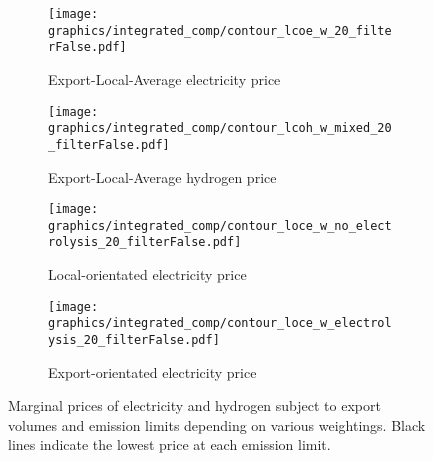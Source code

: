 \begin{figure*}[h] %
    \centering
    \begin{subfigure}[b]{0.45\linewidth}
        \centering
        \texttt{[image: graphics/integrated\_comp/contour\_lcoe\_w\_20\_filterFalse.pdf]}
        \caption{Export-Local-Average electricity price}
        \label{fig:export_local_el_price}
    \end{subfigure}
    \hfill
    \begin{subfigure}[b]{0.45\linewidth}
        \centering
        \texttt{[image: graphics/integrated\_comp/contour\_lcoh\_w\_mixed\_20\_filterFalse.pdf]}
        \caption{Export-Local-Average hydrogen price}
        \label{fig:export_local_hy_price}
    \end{subfigure}
    \hfill
    \begin{subfigure}[b]{0.45\linewidth}
        \centering
        \texttt{[image: graphics/integrated\_comp/contour\_loce\_w\_no\_electrolysis\_20\_filterFalse.pdf]}
        \caption{Local-orientated electricity price}
        \label{fig:local_el_price_appendix}
    \end{subfigure}
    \hfill
    \begin{subfigure}[b]{0.45\linewidth}
        \centering
        \texttt{[image: graphics/integrated\_comp/contour\_loce\_w\_electrolysis\_20\_filterFalse.pdf]}
        \caption{Export-orientated electricity price}
        \label{fig:export_el_price}
    \end{subfigure}
    \hfill

    \caption{Marginal prices of electricity and hydrogen subject to export volumes and emission limits depending on various weightings. Black lines indicate the lowest price at each emission limit.}
    \label{fig:prices_all}
\end{figure*}
